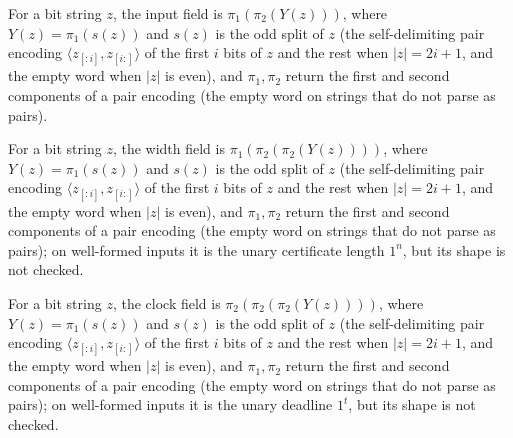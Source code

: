 \begin{definition}
\label{Complexity.tmsatInput}
\leanok
{}
For a bit string $z$, the input field is $\pi_1(\pi_2(Y(z)))$, where $Y(z) = \pi_1(s(z))$ and $s(z)$ is the odd split of $z$ (the self-delimiting pair encoding $\langle z_{[:i]}, z_{[i:]}\rangle$ of the first $i$ bits of $z$ and the rest when $|z| = 2i+1$, and the empty word when $|z|$ is even), and $\pi_1, \pi_2$ return the first and second components of a pair encoding (the empty word on strings that do not parse as pairs).
\end{definition}

\begin{definition}
\label{Complexity.tmsatWidth}
\leanok
{}
For a bit string $z$, the width field is $\pi_1(\pi_2(\pi_2(Y(z))))$, where $Y(z) = \pi_1(s(z))$ and $s(z)$ is the odd split of $z$ (the self-delimiting pair encoding $\langle z_{[:i]}, z_{[i:]}\rangle$ of the first $i$ bits of $z$ and the rest when $|z| = 2i+1$, and the empty word when $|z|$ is even), and $\pi_1, \pi_2$ return the first and second components of a pair encoding (the empty word on strings that do not parse as pairs); on well-formed inputs it is the unary certificate length $1^n$, but its shape is not checked.
\end{definition}

\begin{definition}
\label{Complexity.tmsatClock}
\leanok
{}
For a bit string $z$, the clock field is $\pi_2(\pi_2(\pi_2(Y(z))))$, where $Y(z) = \pi_1(s(z))$ and $s(z)$ is the odd split of $z$ (the self-delimiting pair encoding $\langle z_{[:i]}, z_{[i:]}\rangle$ of the first $i$ bits of $z$ and the rest when $|z| = 2i+1$, and the empty word when $|z|$ is even), and $\pi_1, \pi_2$ return the first and second components of a pair encoding (the empty word on strings that do not parse as pairs); on well-formed inputs it is the unary deadline $1^t$, but its shape is not checked.
\end{definition}

